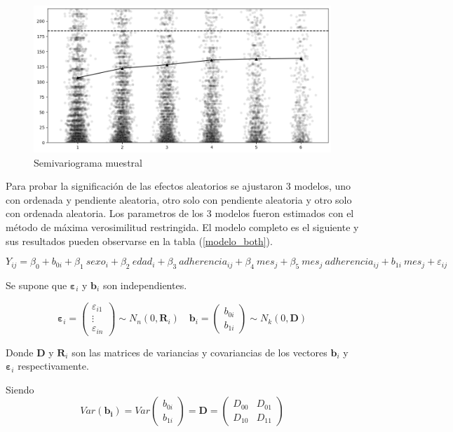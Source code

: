 \documentclass[spanish]{article}
\numberwithin{figure}{subsection}
\numberwithin{equation}{subsection}
\numberwithin{table}{subsection}
\begin{document}
\begin{figure}[H]
	\centering
	\includegraphics[scale=0.4]{img/semivariogram.png}
	\caption{Semivariograma muestral}
	\label{semivariogram}
\end{figure}

Para probar la significación de las efectos aleatorios se ajustaron 3 modelos,
uno con ordenada y pendiente aleatoria, otro solo con pendiente aleatoria y otro
solo con ordenada aleatoria. Los parametros de los 3 modelos fueron estimados
con el método de máxima verosimilitud restringida. El modelo completo es el
siguiente y sus resultados pueden observarse en la tabla (\ref{modelo_both}).

\[
	Y_{ij} = \beta_0 + b_{0i} + \beta_1\ sexo_i + \beta_2\ edad_i + \beta_3\ adherencia_{ij}
	+ \beta_4\ mes_j + \beta_5\ mes_j\ adherencia_{ij} + b_{1i}\ mes_j + \varepsilon_{ij}
\]

Se supone que $\bm{\varepsilon}_i$ y $\bm{b}_i$ son independientes.

\[ 
	\bm{\varepsilon}_i = \begin{pmatrix} \varepsilon_{i1} \\ \vdots \\ \varepsilon_{in} \end{pmatrix} \sim N_{n}(0, \bm{R}_i)
	\quad
	\bm{b}_i = \begin{pmatrix} b_{0i} \\ b_{1i} \end{pmatrix} \sim N_k(0, \bm{D})
\]

Donde $\bm{D}$ y $\bm{R}_i$ son las matrices de variancias y covariancias de los
vectores $\bm{b}_i$ y $\bm{\varepsilon}_i$ respectivamente.

Siendo \[
	Var(\bm{b_i}) = Var\begin{pmatrix} b_{0i} \\ b_{1i} \end{pmatrix}
	= \bm{D} = \begin{pmatrix} D_{00} & D_{01} \\ D_{10} & D_{11} \end{pmatrix}
\]
\end{document}

